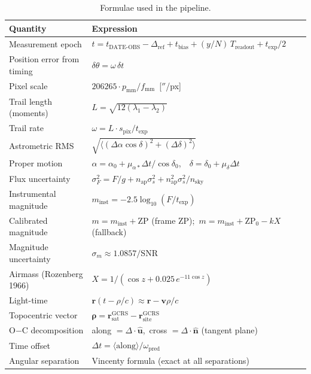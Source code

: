 \documentclass[11pt,a4paper]{article}
\renewcommand{\arraystretch}{1.25}
\begin{document}
\begin{table}[H]
\centering\small
\renewcommand{\arraystretch}{1.6}
\begin{tabularx}{\textwidth}{@{}p{44mm}L@{}}
\toprule
\textbf{Quantity} & \textbf{Expression} \\
\midrule
Measurement epoch & $t = t_\mathrm{DATE\text{-}OBS} - \Delta_\mathrm{ref} + t_\mathrm{bias} + (y/N)\,T_\mathrm{readout} + t_\mathrm{exp}/2$ \\
Position error from timing & $\delta\theta = \omega\,\delta t$ \\
Pixel scale & $206265 \cdot p_\mathrm{mm} / f_\mathrm{mm}$\ [$''$/px] \\
Trail length (moments) & $L = \sqrt{12(\lambda_1-\lambda_2)}$ \\
Trail rate & $\omega = L\cdot s_\mathrm{pix}/t_\mathrm{exp}$ \\
Astrometric RMS & $\sqrt{\langle(\Delta\alpha\cos\delta)^2+(\Delta\delta)^2\rangle}$ \\
Proper motion & $\alpha = \alpha_0 + \mu_{\alpha*}\Delta t/\cos\delta_0$,\ \ $\delta = \delta_0 + \mu_\delta\Delta t$ \\
Flux uncertainty & $\sigma_F^2 = F/g + n_\mathrm{ap}\sigma_s^2 + n_\mathrm{ap}^2\sigma_s^2/n_\mathrm{sky}$ \\
Instrumental magnitude & $m_\mathrm{inst} = -2.5\log_{10}(F/t_\mathrm{exp})$ \\
Calibrated magnitude & $m = m_\mathrm{inst} + \mathrm{ZP}$ (frame ZP);\ $m = m_\mathrm{inst} + \mathrm{ZP}_0 - kX$ (fallback) \\
Magnitude uncertainty & $\sigma_m \approx 1.0857/\mathrm{SNR}$ \\
Airmass (Rozenberg 1966) & $X = 1/(\cos z + 0.025\,e^{-11\cos z})$ \\
Light-time & $\mathbf{r}(t-\rho/c) \approx \mathbf{r}-\mathbf{v}\rho/c$ \\
Topocentric vector & $\boldsymbol{\rho} = \mathbf{r}_\mathrm{sat}^\mathrm{GCRS} - \mathbf{r}_\mathrm{site}^\mathrm{GCRS}$ \\
O$-$C decomposition & along $= \Delta\cdot\hat{\mathbf u}$,\ cross $= \Delta\cdot\hat{\mathbf n}$ (tangent plane) \\
Time offset & $\Delta t = \langle\mathrm{along}\rangle / \omega_\mathrm{pred}$ \\
Angular separation & Vincenty formula (exact at all separations) \\
\bottomrule
\end{tabularx}
\caption{Formulae used in the pipeline.}
\end{table}
\end{document}
